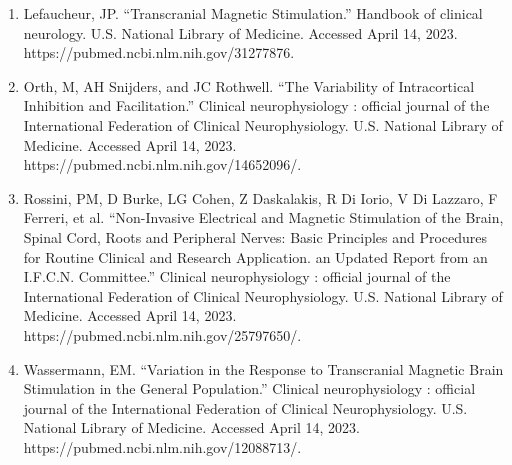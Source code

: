 \documentclass{article}
\begin{document}
\begin{enumerate}
    \item Lefaucheur, JP. “Transcranial Magnetic Stimulation.” Handbook of clinical neurology. U.S. National Library of Medicine. Accessed April 14, 2023. https://pubmed.ncbi.nlm.nih.gov/31277876. 
    \item Orth, M, AH Snijders, and JC Rothwell. “The Variability of Intracortical Inhibition and Facilitation.” Clinical neurophysiology : official journal of the International Federation of Clinical Neurophysiology. U.S. National Library of Medicine. Accessed April 14, 2023. https://pubmed.ncbi.nlm.nih.gov/14652096/. 
    \item Rossini, PM, D Burke, LG Cohen, Z Daskalakis, R Di Iorio, V Di Lazzaro, F Ferreri, et al. “Non-Invasive Electrical and Magnetic Stimulation of the Brain, Spinal Cord, Roots and Peripheral Nerves: Basic Principles and Procedures for Routine Clinical and Research Application. an Updated Report from an I.F.C.N. Committee.” Clinical neurophysiology : official journal of the International Federation of Clinical Neurophysiology. U.S. National Library of Medicine. Accessed April 14, 2023. https://pubmed.ncbi.nlm.nih.gov/25797650/. 
        \item Wassermann, EM. “Variation in the Response to Transcranial
            Magnetic Brain Stimulation in the General Population.” Clinical
            neurophysiology : official journal of the International Federation
            of Clinical Neurophysiology. U.S. National Library of Medicine.
            Accessed April 14, 2023. \newline https://pubmed.ncbi.nlm.nih.gov/12088713/. 
\end{enumerate}

\pagebreak
\end{document}
